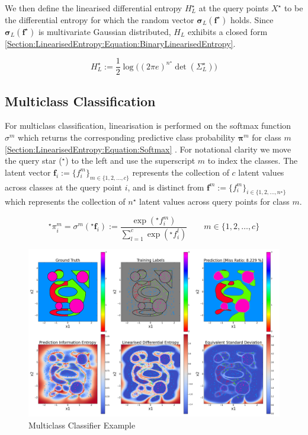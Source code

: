 \documentclass{article}
\renewcommand{\vec}[1]{\boldsymbol{#1}}
\begin{document}
			We then define the linearised differential entropy $H^{\star}_{L}$ at the query points $X^{\star}$ to be the differential entropy for which the random vector $\vec{\sigma}_{L}(\vec{f}^{\star})$ holds. Since $\vec{\sigma}_{L}(\vec{f}^{\star})$ is multivariate Gaussian distributed, $H_{L}$ exhibits a closed form \eqref{Section:LinearisedEntropy:Equation:BinaryLinearisedEntropy}.
			
			\begin{equation}
				H^{\star}_{L} := \frac{1}{2} \log\Big((2 \pi e)^{n^{\star}} \det(\Sigma^{\star}_{L})\Big)
			\label{Section:LinearisedEntropy:Equation:BinaryLinearisedEntropy}
			\end{equation}			
					
	\subsection{Multiclass Classification}
			
		For multiclass classification, linearisation is performed on the softmax function $\sigma^{m}$ which returns the corresponding predictive class probability $\vec{\pi}^{m}$ for class $m$ \eqref{Section:LinearisedEntropy:Equation:Softmax} \cite{GaussianProcessForMachineLearning}. For notational clarity we move the query star ($^\star$) to the left and use the superscript $m$ to index the classes. The latent vector $\vec{f}_{i} := \{f^{m}_{i}\}_{m \in \{1, 2, \dots, c\}}$ represents the collection of $c$ latent values across classes at the query point $i$, and is distinct from $\vec{f}^{m} := \{f^{m}_{i}\}_{i \in \{1, 2, \dots, n^{\star}\}}$ which represents the collection of $n^{\star}$ latent values across query points for class $m$.

		\begin{equation}
			^{\star}\pi^{m}_{i} = \sigma^{m}(^{\star}\vec{f}_{i}) := \frac{\exp(^{\star}f^{m}_{i})}{\sum_{l = 1}^{c} \exp(^{\star}f^{l}_{i})} \qquad m \in \{1, 2, \dots, c\}
		\label{Section:LinearisedEntropy:Equation:Softmax}
		\end{equation}
			
		\begin{figure}[!htbp]
		\centering
			\includegraphics[width = \linewidth]{Figures/multiclass_linearised_entropy_horizontal/Figure1.png}
		\caption{Multiclass Classifier Example}
		\label{Figure:Results:MulticlassLinearisedEntropy}
		\end{figure}
		
\end{document}
